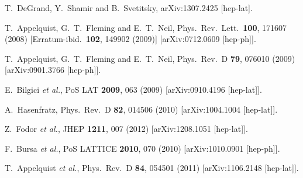 \begin{thebibliography}{99}
  T.~DeGrand, Y.~Shamir and B.~Svetitsky,
  arXiv:1307.2425 [hep-lat].
  
  T.~Appelquist, G.~T.~Fleming and E.~T.~Neil,
  Phys.\ Rev.\ Lett.\  {\bf 100}, 171607 (2008)
  [Erratum-ibid.\  {\bf 102}, 149902 (2009)]
  [arXiv:0712.0609 [hep-ph]].
  
  T.~Appelquist, G.~T.~Fleming and E.~T.~Neil,
  Phys.\ Rev.\ D {\bf 79}, 076010 (2009)
  [arXiv:0901.3766 [hep-ph]].

  E.~Bilgici {\it et al.},
  PoS LAT {\bf 2009}, 063 (2009)
  [arXiv:0910.4196 [hep-lat]].
  
  A.~Hasenfratz,
  Phys.\ Rev.\ D {\bf 82}, 014506 (2010)
  [arXiv:1004.1004 [hep-lat]].
  
  Z.~Fodor {\it et al.},
  JHEP {\bf 1211}, 007 (2012)
  [arXiv:1208.1051 [hep-lat]].

  F.~Bursa {\it et al.},
  PoS LATTICE {\bf 2010}, 070 (2010)
  [arXiv:1010.0901 [hep-ph]].

  T.~Appelquist {\it et al.},
  Phys.\ Rev.\ D {\bf 84}, 054501 (2011)
  [arXiv:1106.2148 [hep-lat]].


\end{thebibliography}
